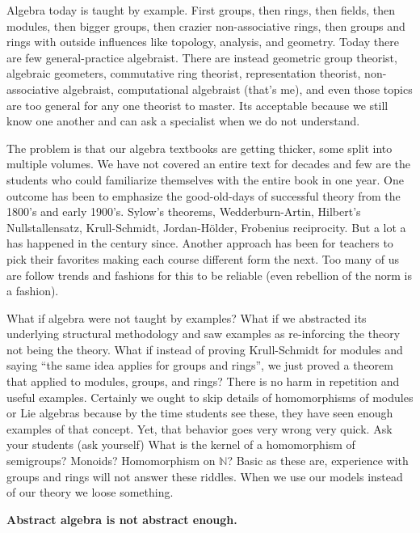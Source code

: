 
Algebra today is taught by example. First groups, then rings,
then fields, then modules, then bigger groups, then crazier non-associative
rings, then groups and rings with outside influences like topology, analysis,
and geometry. Today there are few general-practice algebraist.  There are
instead geometric group theorist, algebraic geometers, commutative ring
theorist, representation theorist, non-associative algebraist, computational
algebraist (that's me), and even those topics are too general for any one
theorist to master. Its acceptable because we still know one another and can ask
a specialist when we do not understand. 

The problem is that our algebra textbooks are getting thicker, some split into
multiple volumes. We have not covered an entire text for decades and few are 
the students who could familiarize themselves with the entire book in one year.
One outcome has been to emphasize the good-old-days of successful theory from the
1800's and early 1900's.  Sylow's theorems, Wedderburn-Artin, Hilbert's
Nullstallensatz, Krull-Schmidt, Jordan-H\"older, Frobenius reciprocity. But a
lot a has happened in the century since.  Another approach has been for teachers to
pick their favorites making each course different form the next.  
Too many of us are follow trends and fashions for this to be reliable (even 
rebellion of the norm is a fashion).

What if algebra were not taught by examples?  What if we abstracted its
underlying structural methodology and saw examples as re-inforcing the theory
not being the theory.  What if instead of proving Krull-Schmidt for modules and
saying ``the same idea applies for groups and rings'', we just proved a theorem
that applied to modules, groups, and rings?  There is no harm in repetition and
useful examples.  Certainly we ought to skip details of homomorphisms of modules
or Lie algebras because by the time students see these, they have seen enough
examples of that concept.  Yet, that behavior goes very wrong very quick.  Ask
your students (ask yourself) What is the kernel of a homomorphism of semigroups?
Monoids?  Homomorphism on $\mathbb{N}$?  Basic as these are, experience 
with groups and rings will not answer these riddles.
When we use our models instead of our theory 
we loose something.  

\begin{center}
    \textbf{Abstract algebra is not abstract enough.}
\end{center}